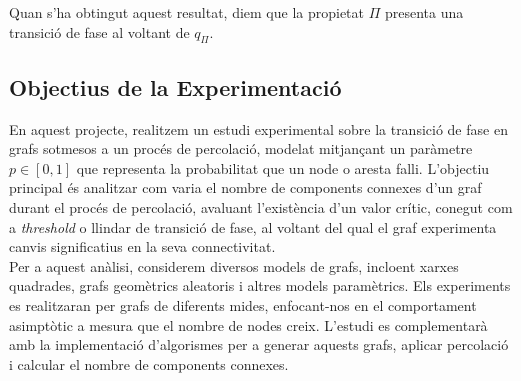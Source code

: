 \documentclass[a4paper]{article}
\begin{document}
	Quan s'ha obtingut aquest resultat, diem que la propietat $\Pi$ presenta una transició de fase al voltant de $q_{\Pi}$.
	
	\subsection{Objectius de la Experimentació}
	
	En aquest projecte, realitzem un estudi experimental sobre la transició de fase en grafs sotmesos a un procés de percolació, modelat mitjançant un paràmetre $p \in [0, 1]$ que representa la probabilitat que un node o aresta falli. L'objectiu principal és analitzar com varia el nombre de components connexes d'un graf durant el procés de percolació, avaluant l'existència d'un valor crític, conegut com a \textit{threshold} o llindar de transició de fase, al voltant del qual el graf experimenta canvis significatius en la seva connectivitat. \\
	
	Per a aquest anàlisi, considerem diversos models de grafs, incloent xarxes quadrades, grafs geomètrics aleatoris i altres models paramètrics. Els experiments es realitzaran per grafs de diferents mides, enfocant-nos en el comportament asimptòtic a mesura que el nombre de nodes creix. L'estudi es complementarà amb la implementació d'algorismes per a generar aquests grafs, aplicar percolació i calcular el nombre de components connexes. \\
	
\end{document}
